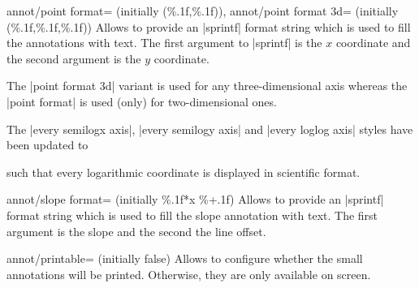 \begin{pgfplotskeylist}{%
    annot/point format= (initially {(\%.1f,\%.1f)}),
    annot/point format 3d= (initially {(\%.1f,\%.1f,\%.1f)})%
}
    Allows to provide an |sprintf| format string which is used to fill the
    annotations with text. The first argument to |sprintf| is the
    $x$ coordinate and the second argument is the $y$ coordinate.

    The |point format 3d| variant is used for any three-dimensional axis
    whereas the |point format| is used (only) for two-dimensional ones.

    The |every semilogx axis|, |every semilogy axis| and |every loglog axis|
    styles have been updated to
\begin{codeexample}
\end{codeexample}
    \noindent such 
	that every logarithmic coordinate is displayed in scientific
    format.
\end{pgfplotskeylist}

\begin{pgfplotskey}{annot/slope format= (initially \%.1f*x \%+.1f)}
    Allows to provide an |sprintf| format string which is used to fill the
    slope annotation with text. The first argument is the slope and the second
    the line offset.
\end{pgfplotskey}

\begin{pgfplotskey}{annot/printable= (initially false)}
    Allows to configure whether the small annotations will be printed.
    Otherwise, they are only available on screen.
\end{pgfplotskey}

